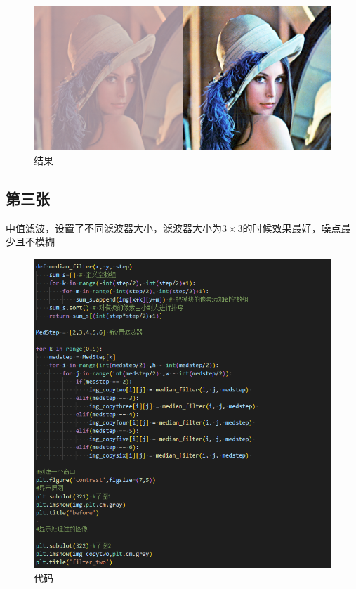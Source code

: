 \documentclass[fontset=windows]{article}
\begin{document}
            \begin{figure}[H]
                \centering
                \includegraphics[scale=0.35]{after3.png}
                \caption{结果}
            \end{figure}

        \subsection{第三张}

            中值滤波，设置了不同滤波器大小，滤波器大小为$3 \times 3$的时候效果最好，噪点最少且不模糊 

            \begin{figure}[H]
                \centering
                \includegraphics[scale=0.6]{code4.png}
                \caption{代码}
            \end{figure}
\end{document}
